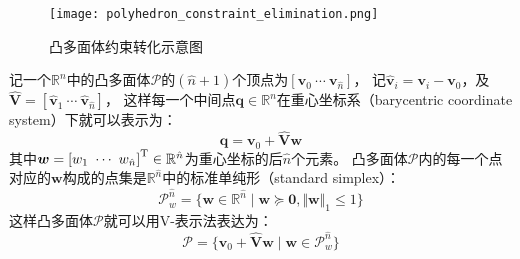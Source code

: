 \begin{figure}[ht]
  \centering
  \texttt{[image: polyhedron\_constraint\_elimination.png]}
  \caption{凸多面体约束转化示意图}
  \label{fig:transformation_of_polyhedron_constraints}
\end{figure}

记一个$\mathbb{R}^n$中的凸多面体$\mathcal{P}$的$(\hat{n}+1)$个顶点为$[\bm{v}_0 \ \cdots \ \bm{v}_{\hat{n}}]$，
记$\hat{\bm{v}}_i = \bm{v}_i - \bm{v}_0$，及$\hat{\bm{V}} = [\hat{\bm{v}}_1 \ \cdots \ \hat{\bm{v}}_{\hat{n}}]$，
这样每一个中间点$\bm{q}\in\mathbb{R}^n$在重心坐标系（barycentric coordinate system）下就可以表示为：
\begin{equation}
  \bm{q} = \bm{v}_0 + \hat{\bm{V}}\bm{w}
  \label{equ:q_in_barycentric_coordinate}
\end{equation}
其中$\bm{w} = \trans{[w_1 \ \cdots \ w_{\hat{n}}]}\in\mathbb{R}^{\hat{n}}$为重心坐标的后$\hat{n}$个元素。
凸多面体$\mathcal{P}$内的每一个点对应的$\bm{w}$构成的点集是$\mathbb{R}^{\hat{n}}$中的标准单纯形（standard simplex）：
\begin{equation}
  \mathcal{P}_w^{\hat{n}} = \{
    \bm{w} \in \mathbb{R}^{\hat{n}} \mid \bm{w} \succeq \textbf{0}, \Vert \bm{w} \Vert_1 \leq 1
  \}
  \label{equ:standard_simplex}
\end{equation}
这样凸多面体$\mathcal{P}$就可以用V-表示法表达为：
\begin{equation}
  \mathcal{P} = \{
    \bm{v}_0 + \hat{\bm{V}}\bm{w} \mid \bm{w} \in \mathcal{P}_w^{\hat{n}}
  \}
  \label{equ:V_polyhedron}
\end{equation}

